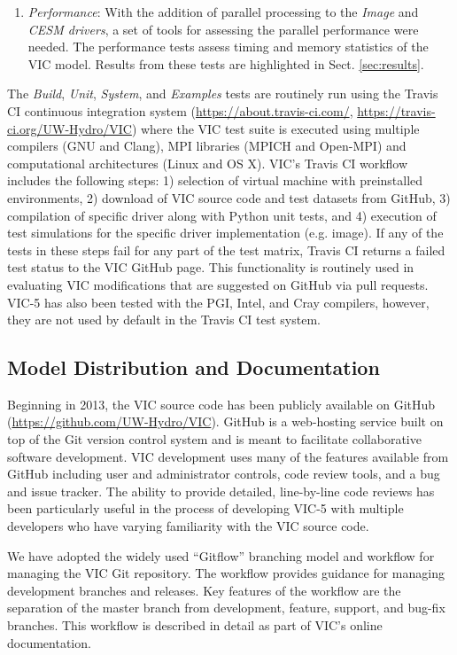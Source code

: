 \documentclass[gmd, manuscript]{copernicus}
\begin{document}
\begin{enumerate}
      \item \textit{Performance}: With the addition of parallel processing to the \textit{Image} and \textit{CESM drivers}, a set of tools for assessing the parallel performance were needed. The performance tests assess timing and memory statistics of the VIC model. Results from these tests are highlighted in Sect. \ref{sec:results}.
    \end{enumerate}

    The \textit{Build}, \textit{Unit}, \textit{System}, and \textit{Examples} tests are routinely run using the Travis CI continuous integration system (\url{https://about.travis-ci.com/}, \url{https://travis-ci.org/UW-Hydro/VIC}) where the VIC test suite is executed using multiple compilers (GNU and Clang), MPI libraries (MPICH and Open-MPI) and computational architectures (Linux and OS X). VIC's Travis CI workflow includes the following steps: 1) selection of virtual machine with preinstalled environments, 2) download of VIC source code and test datasets from GitHub, 3) compilation of specific driver along with Python unit tests, and 4) execution of test simulations for the specific driver implementation (e.g. image). If any of the tests in these steps fail for any part of the test matrix, Travis CI returns a failed test status to the VIC GitHub page. This functionality is routinely used in evaluating VIC modifications that are suggested on GitHub via pull requests. VIC-5 has also been tested with the PGI, Intel, and Cray compilers, however, they are not used by default in the Travis CI test system.

  \subsection{Model Distribution and Documentation}

    Beginning in 2013, the VIC source code has been publicly available on GitHub (\url{https://github.com/UW-Hydro/VIC}). GitHub is a web-hosting service built on top of the Git version control system and is meant to facilitate collaborative software development. VIC development uses many of the features available from GitHub including user and administrator controls, code review tools, and a bug and issue tracker. The ability to provide detailed, line-by-line code reviews has been particularly useful in the process of developing VIC-5 with multiple developers who have varying familiarity with the VIC source code.

    We have adopted the widely used ``Gitflow'' branching model and workflow for managing the VIC Git repository. The workflow provides guidance for managing development branches and releases. Key features of the workflow are the separation of the master branch from development, feature, support, and bug-fix branches. This workflow is described in detail as part of VIC's online documentation.
\end{document}
